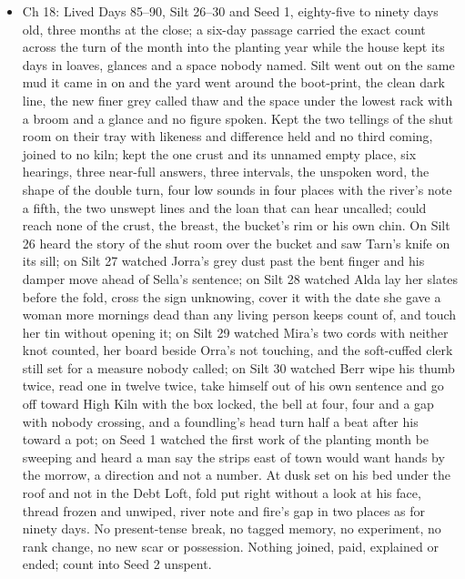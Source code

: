 \documentclass{design/chronicle}
\begin{document}
{\begin{itemize}[leftmargin=1.4em,itemsep=1pt,topsep=3pt,parsep=0pt]
\item Ch 18: Lived Days 85–90, Silt 26–30 and Seed 1, eighty-five to ninety days old, three months at the close; a six-day passage carried the exact count across the turn of the month into the planting year while the house kept its days in loaves, glances and a space nobody named. Silt went out on the same mud it came in on and the yard went around the boot-print, the clean dark line, the new finer grey called thaw and the space under the lowest rack with a broom and a glance and no figure spoken. Kept the two tellings of the shut room on their tray with likeness and difference held and no third coming, joined to no kiln; kept the one crust and its unnamed empty place, six hearings, three near-full answers, three intervals, the unspoken word, the shape of the double turn, four low sounds in four places with the river’s note a fifth, the two unswept lines and the loan that can hear uncalled; could reach none of the crust, the breast, the bucket’s rim or his own chin. On Silt 26 heard the story of the shut room over the bucket and saw Tarn’s knife on its sill; on Silt 27 watched Jorra’s grey dust past the bent finger and his damper move ahead of Sella’s sentence; on Silt 28 watched Alda lay her slates before the fold, cross the sign unknowing, cover it with the date she gave a woman more mornings dead than any living person keeps count of, and touch her tin without opening it; on Silt 29 watched Mira’s two cords with neither knot counted, her board beside Orra’s not touching, and the soft-cuffed clerk still set for a measure nobody called; on Silt 30 watched Berr wipe his thumb twice, read one in twelve twice, take himself out of his own sentence and go off toward High Kiln with the box locked, the bell at four, four and a gap with nobody crossing, and a foundling’s head turn half a beat after his toward a pot; on Seed 1 watched the first work of the planting month be sweeping and heard a man say the strips east of town would want hands by the morrow, a direction and not a number. At dusk set on his bed under the roof and not in the Debt Loft, fold put right without a look at his face, thread frozen and unwiped, river note and fire’s gap in two places as for ninety days. No present-tense break, no tagged memory, no experiment, no rank change, no new scar or possession. Nothing joined, paid, explained or ended; count into Seed 2 unspent.

\end{itemize}

\begin{itemize}[leftmargin=1.4em,itemsep=1pt,topsep=3pt,parsep=0pt]


\end{itemize}}
\end{document}
